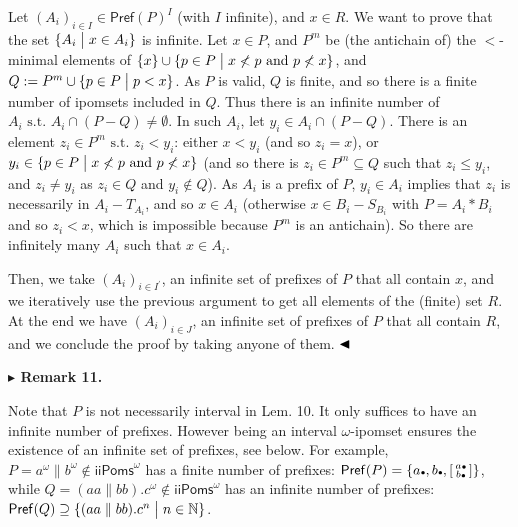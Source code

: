  
Let $(A_{i})_{i\in I}\in\mathsf{Pref}(P)^{I}$ (with $I$ infinite), and $x\in R$. We want to prove that the set ${\{A_{i}\mathrel{\big{|}}x\in A_{i}\}}$ is infinite. Let $x\in P$, and $P^{m}$ be (the antichain of) the $<$-minimal elements of ${\{x\}}\cup{\{p\in P\mathrel{\big{|}}x\not<p\text{ and }p\not<x\}}$, and $Q:=P^{m}\cup{\{p\in P\mathrel{\big{|}}p<x\}}$. As $P$ is valid, $Q$ is finite, and so there is a finite number of ipomsets included in $Q$. Thus there is an infinite number of $A_{i}\text{ s.t.\ }A_{i}\cap(P-Q)\neq\emptyset$. In such $A_{i}$, let $y_{i}\in A_{i}\cap(P-Q)$. There is an element $z_{i}\in P^{m}\text{ s.t.\ }z_{i}<y_{i}$: either $x<y_{i}$ (and so $z_{i}=x$), or $y_{i}\in{\{p\in P\mathrel{\big{|}}x\not<p\text{ and }p\not<x\}}$ (and so there is $z_{i}\in P^{m}\subseteq Q$ such that $z_{i}\leqslant y_{i}$, and $z_{i}\neq y_{i}$ as $z_{i}\in Q$ and $y_{i}\not\in Q$). As $A_{i}$ is a prefix of $P$, $y_{i}\in A_{i}$ implies that $z_{i}$ is necessarily in $A_{i}-T_{A_{i}}$, and so $x\in A_{i}$ (otherwise $x\in B_{i}-S_{B_{i}}$ with $P=A_{i}*B_{i}$ and so $z_{i}<x$, which is impossible because $P^{m}$ is an antichain). So there are infinitely many $A_{i}$ such that $x\in A_{i}$.\par
 
 
 
Then, we take $(A_{i})_{i\in I^{\prime}}$, an infinite set of prefixes of $P$ that all contain $x$, and we iteratively use the previous argument to get all elements of the (finite) set $R$. At the end we have $(A_{i})_{i\in J}$, an infinite set of prefixes of $P$ that all contain $R$, and we conclude the proof by taking anyone of them. $\hfill\blacktriangleleft$\par
 
 
 
\par\medskip\noindent\textbf{$\blacktriangleright$ Remark 11.}\par
 
 
Note that $P$ is not necessarily interval in Lem. 10. It only suffices to have an infinite number of prefixes. However being an interval $\omega$-ipomset ensures the existence of an infinite set of prefixes, see below. For example, $P=a^{\omega}\parallel b^{\omega}\not\in{\mathsf{iiPoms}^{\omega}}$ has a finite number of prefixes: $\mathsf{Pref}(P)={\{a\vbox{\hbox{\tiny$\bullet$}},b\vbox{\hbox{\tiny$\bullet$}},\left[\begin{smallmatrix}a\vbox{\hbox{\tiny$\bullet$}}\\
b\vbox{\hbox{\tiny$\bullet$}}\end{smallmatrix}\right]\}}$, while $Q=(aa\parallel bb).c^{\omega}\not\in{\mathsf{iiPoms}^{\omega}}$ has an infinite number of prefixes: $\mathsf{Pref}(Q)\supseteq{\{(aa\parallel bb).c^{n}\mathrel{\big{|}}n\in\mathbb{N}\}}$.\par
 
